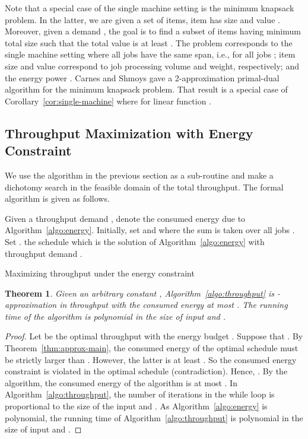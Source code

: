 \documentclass[11pt,a4paper]{article}
\newtheorem{theorem}{Theorem}
\begin{document}
Note that a special case of the single machine setting is the minimum knapsack problem.
In the latter, we are given a set of  items, item  has size  and value .
Moreover, given a demand , the goal is to find a subset of items having minimum total 
size such that the total value is at least . The problem corresponds to the single machine 
setting where all jobs have the same span, i.e.,  for all jobs
; item size and value correspond to job processing volume and weight, respectively;
and the energy power . Carnes and Shmoys \cite{CarnesShmoys08:Primal-Dual-Schema} 
gave a 2-approximation primal-dual
algorithm for the minimum knapsack problem. That result is a special case of 
Corollary~\ref{cor:single-machine} where  for linear function . 

\subsection{Throughput Maximization with Energy Constraint} 	\label{sec:approx-throughput}
We use the algorithm in the previous section as a sub-routine and 
make a dichotomy search in the feasible domain of the total throughput. 
The formal algorithm is given as follows.

\begin{algorithm}[htbp]
\begin{algorithmic}[1] 
\STATE Given a throughput demand , denote  the 
	consumed energy due to Algorithm~\ref{algo:energy}. 
\STATE Initially, set  and  where the sum is taken over all jobs .
\STATE Set .
	\IF{} 
		\STATE 
	\ENDIF
	\IF{} 
		\STATE 
	\ENDIF
	\STATE 
\ENDWHILE
\RETURN the schedule which is the solution of Algorithm~\ref{algo:energy} with throughput demand .
\end{algorithmic}
\caption{Maximizing throughput under the energy constraint}
\label{algo:throughput}
\end{algorithm}

\begin{theorem}
Given an arbitrary constant , Algorithm~\ref{algo:throughput} is
-approximation in throughput with the consumed energy at most 
. The running time of the algorithm is 
polynomial in the size of input and . 
\end{theorem}
\begin{proof}
Let  be the optimal throughput with the energy budget . 
Suppose that . By Theorem~\ref{thm:approx-main},
the consumed energy of the optimal schedule must be strictly larger than . However, the latter is 
at least . So the consumed energy constraint is violated in the optimal schedule
(contradiction). Hence, . By the algorithm, the consumed energy
of the algorithm is at most . In Algorithm~\ref{algo:throughput}, 
the number of iterations in the while loop is proportional to the size of the input and .
As Algorithm~\ref{algo:energy} is polynomial, the running time of Algorithm~\ref{algo:throughput}
is polynomial in the size of input and . 
\end{proof}
\end{document}
